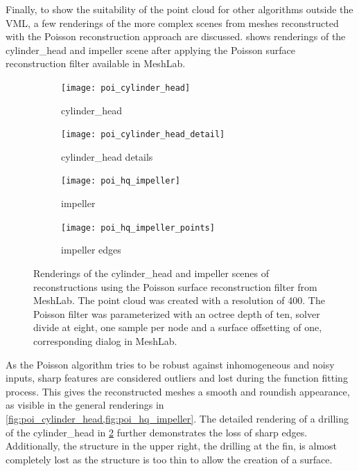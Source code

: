 Finally, to show the suitability of the point cloud for other algorithms outside the VML, a few renderings of the more complex scenes from meshes reconstructed with the Poisson reconstruction approach are discussed.
 shows renderings of the cylinder\_head and impeller scene after applying the Poisson surface reconstruction filter available in MeshLab.
%
\begin{figure}
	\centering
	\begin{subfigure}[b]{0.49\textwidth}
		\centering
		\texttt{[image: poi\_cylinder\_head]}
		\caption{cylinder\_head}
		\label{fig:poi_cylinder_head}
	\end{subfigure}
	\begin{subfigure}[b]{0.49\textwidth}
		\centering
		\texttt{[image: poi\_cylinder\_head\_detail]}
		\caption{cylinder\_head details}
		\label{fig:poi_cylinder_head_detail}
	\end{subfigure}
	\begin{subfigure}[b]{0.49\textwidth}
		\centering
		\texttt{[image: poi\_hq\_impeller]}
		\caption{impeller}
		\label{fig:poi_hq_impeller}
	\end{subfigure}
	\begin{subfigure}[b]{0.49\textwidth}
		\centering
		\texttt{[image: poi\_hq\_impeller\_points]}
		\caption{impeller edges}
		\label{fig:poi_hq_impeller_points}
	\end{subfigure}
	\caption{
		Renderings of the cylinder\_head and impeller scenes of reconstructions using the Poisson surface reconstruction filter from MeshLab.
		The point cloud was created with a resolution of 400.
		The Poisson filter was parameterized with an octree depth of ten, solver divide at eight, one sample per node and a surface offsetting of one, \cf corresponding dialog in MeshLab.
	}
	\label{fig:poisson_results}
\end{figure}
%
As the Poisson algorithm tries to be robust against inhomogeneous and noisy inputs, sharp features are considered outliers and lost during the function fitting process.
This gives the reconstructed meshes a smooth and roundish appearance, as visible in the general renderings in \cref{fig:poi_cylinder_head,fig:poi_hq_impeller}.
The detailed rendering of a drilling of the cylinder\_head in \cref{fig:poi_cylinder_head_detail} further demonstrates the loss of sharp edges.
Additionally, the structure in the upper right, the drilling at the fin, is almost completely lost as the structure is too thin to allow the creation of a surface.

